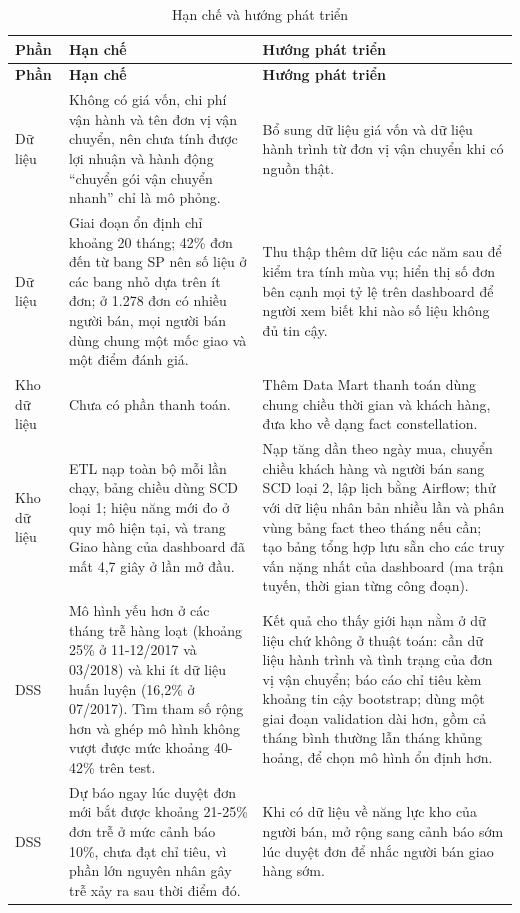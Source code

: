 \begingroup\small{}
\begin{longtable}{|P{1.9cm}|>{\raggedright\arraybackslash}p{5.9cm}|>{\raggedright\arraybackslash}p{5.9cm}|}
\caption{Hạn chế và hướng phát triển}\label{tab:huongphattrien}\\
\hline
\textbf{Phần} & \textbf{Hạn chế} & \textbf{Hướng phát triển}\\ \hline \endfirsthead
\hline
\textbf{Phần} & \textbf{Hạn chế} & \textbf{Hướng phát triển}\\ \hline \endhead
Dữ liệu & Không có giá vốn, chi phí vận hành và tên đơn vị vận chuyển, nên chưa tính được lợi nhuận và hành động ``chuyển gói vận chuyển nhanh'' chỉ là mô phỏng. & Bổ sung dữ liệu giá vốn và dữ liệu hành trình từ đơn vị vận chuyển khi có nguồn thật.\\ \hline
Dữ liệu & Giai đoạn ổn định chỉ khoảng 20 tháng; 42\% đơn đến từ bang SP nên số liệu ở các bang nhỏ dựa trên ít đơn; ở 1.278 đơn có nhiều người bán, mọi người bán dùng chung một mốc giao và một điểm đánh giá. & Thu thập thêm dữ liệu các năm sau để kiểm tra tính mùa vụ; hiển thị số đơn bên cạnh mọi tỷ lệ trên dashboard để người xem biết khi nào số liệu không đủ tin cậy.\\ \hline
Kho dữ liệu & Chưa có phần thanh toán. & Thêm Data Mart thanh toán dùng chung chiều thời gian và khách hàng, đưa kho về dạng fact constellation.\\ \hline
Kho dữ liệu & ETL nạp toàn bộ mỗi lần chạy, bảng chiều dùng SCD loại 1; hiệu năng mới đo ở quy mô hiện tại, và trang Giao hàng của dashboard đã mất 4,7 giây ở lần mở đầu. & Nạp tăng dần theo ngày mua, chuyển chiều khách hàng và người bán sang SCD loại 2, lập lịch bằng Airflow; thử với dữ liệu nhân bản nhiều lần và phân vùng bảng fact theo tháng nếu cần; tạo bảng tổng hợp lưu sẵn cho các truy vấn nặng nhất của dashboard (ma trận tuyến, thời gian từng công đoạn).\\ \hline
DSS & Mô hình yếu hơn ở các tháng trễ hàng loạt (khoảng 25\% ở 11-12/2017 và 03/2018) và khi ít dữ liệu huấn luyện (16,2\% ở 07/2017). Tìm tham số rộng hơn và ghép mô hình không vượt được mức khoảng 40-42\% trên test. & Kết quả cho thấy giới hạn nằm ở dữ liệu chứ không ở thuật toán: cần dữ liệu hành trình và tình trạng của đơn vị vận chuyển; báo cáo chỉ tiêu kèm khoảng tin cậy bootstrap; dùng một giai đoạn validation dài hơn, gồm cả tháng bình thường lẫn tháng khủng hoảng, để chọn mô hình ổn định hơn.\\ \hline
DSS & Dự báo ngay lúc duyệt đơn mới bắt được khoảng 21-25\% đơn trễ ở mức cảnh báo 10\%, chưa đạt chỉ tiêu, vì phần lớn nguyên nhân gây trễ xảy ra sau thời điểm đó. & Khi có dữ liệu về năng lực kho của người bán, mở rộng sang cảnh báo sớm lúc duyệt đơn để nhắc người bán giao hàng sớm.\\ \hline

\end{longtable}

